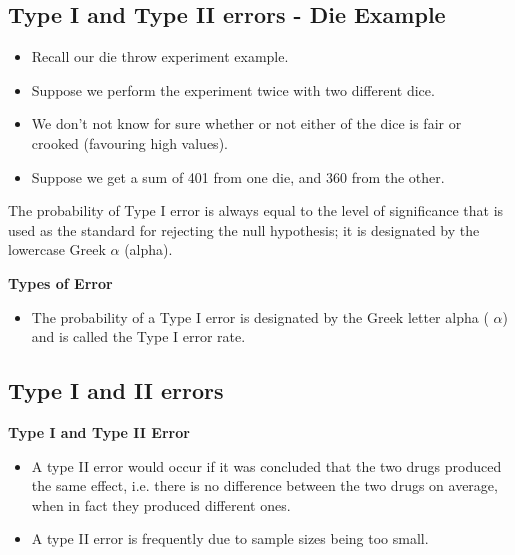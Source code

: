 
\subsection{Type I and Type II errors - Die Example}
\begin{itemize}
\item Recall our die throw experiment example.
\item Suppose we perform the experiment twice with two different dice.
\item We don't not know for sure whether or not either of the dice is fair or crooked (favouring high values).
\item Suppose we get a sum of 401 from one die, and 360 from the other.
\end{itemize}




The probability of Type I error is always equal to the level of significance that is used as the standard for rejecting
the null hypothesis; it is designated by the lowercase Greek $\alpha$ (alpha).




\textbf{Types of Error}
\begin{itemize}
\item The probability of a Type I error is designated by the Greek letter alpha ( $\alpha$) and is called the Type I error rate. 

\end{itemize}






\subsection{Type I and II errors}






\textbf{Type I and Type II Error}
\begin{itemize}

\item A type II error would occur if it was concluded that the two drugs produced the same effect, i.e. there is no difference between the two drugs on average, when in fact they produced different ones.
\item A type II error is frequently due to sample sizes being too small.
\end{itemize}



